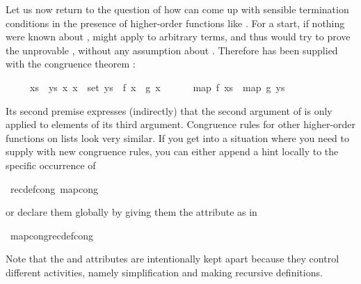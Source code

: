 \begin{isabellebody}
\begin{isamarkuptext}
Let us now return to the question of how  can come up with
sensible termination conditions in the presence of higher-order functions
like . For a start, if nothing were known about ,
 might apply  to arbitrary terms, and thus
 would try to prove the unprovable , without any assumption about .  Therefore
 has been supplied with the congruence theorem
:
\begin{isabelle}%
\ \ \ \ \ {\isasymlbrakk}xs\ {\isacharequal}\ ys{\isacharsemicolon}\ {\isasymAnd}x{\isachardot}\ x\ {\isasymin}\ set\ ys\ {\isasymLongrightarrow}\ f\ x\ {\isacharequal}\ g\ x{\isasymrbrakk}\isanewline
\ \ \ \ \ {\isasymLongrightarrow}\ map\ f\ xs\ {\isacharequal}\ map\ g\ ys%
\end{isabelle}
Its second premise expresses (indirectly) that the second argument of
 is only applied to elements of its third argument. Congruence
rules for other higher-order functions on lists look very similar. If you get
into a situation where you need to supply  with new
congruence rules, you can either append a hint locally
to the specific occurrence of %
\end{isamarkuptext}%
{\isacharparenleft}\ recdef{\isacharunderscore}cong{\isacharcolon}\ map{\isacharunderscore}cong{\isacharparenright}%
\begin{isamarkuptext}%
\noindent
or declare them globally
by giving them the  attribute as in%
\end{isamarkuptext}%
\ map{\isacharunderscore}cong{\isacharbrackleft}recdef{\isacharunderscore}cong{\isacharbrackright}%
\begin{isamarkuptext}%
Note that the  and  attributes are
intentionally kept apart because they control different activities, namely
simplification and making recursive definitions.
\end{isamarkuptext}%
\end{isabellebody}%
